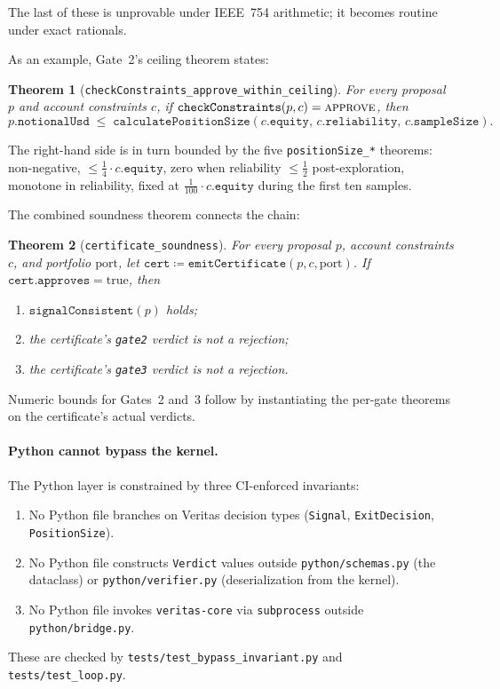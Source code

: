 \documentclass[11pt, a4paper]{article}
\newtheorem{theorem}{Theorem}
\begin{document}
\noindent The last of these is unprovable under IEEE~754 arithmetic;
it becomes routine under exact rationals.

As an example, Gate~2's ceiling theorem states:
\begin{theorem}[\texttt{checkConstraints\_approve\_within\_ceiling}]
\label{thm:gate2}
For every proposal $p$ and account constraints $c$, if
$\texttt{checkConstraints}(p, c) = \textsc{approve}$, then
\[
  p.\texttt{notionalUsd} \;\leq\;
  \texttt{calculatePositionSize}(c.\texttt{equity},\, c.\texttt{reliability},\, c.\texttt{sampleSize}).
\]
\end{theorem}
\noindent The right-hand side is in turn bounded by the five
\texttt{positionSize\_*} theorems: non-negative, $\leq \tfrac{1}{4} \cdot
c.\texttt{equity}$, zero when reliability $\leq \tfrac{1}{2}$
post-exploration, monotone in reliability, fixed at $\tfrac{1}{100}
\cdot c.\texttt{equity}$ during the first ten samples.

The combined soundness theorem connects the chain:
\begin{theorem}[\texttt{certificate\_soundness}]
For every proposal $p$, account constraints $c$, and portfolio
$\text{port}$, let
$\texttt{cert} \coloneqq \texttt{emitCertificate}(p, c, \text{port})$.
If $\texttt{cert}.\texttt{approves} = \text{true}$, then
\begin{enumerate}[leftmargin=2em, itemsep=1pt, topsep=2pt]
\item $\texttt{signalConsistent}(p)$ holds;
\item the certificate's \texttt{gate2} verdict is not a rejection;
\item the certificate's \texttt{gate3} verdict is not a rejection.
\end{enumerate}
\end{theorem}
\noindent Numeric bounds for Gates~2 and~3 follow by instantiating the
per-gate theorems on the certificate's actual verdicts.

\paragraph{Python cannot bypass the kernel.} The Python layer is
constrained by three CI-enforced invariants:
\begin{enumerate}[leftmargin=2em, itemsep=1pt, topsep=2pt]
\item No Python file branches on Veritas decision types
      (\texttt{Signal}, \texttt{ExitDecision}, \texttt{PositionSize}).
\item No Python file constructs \texttt{Verdict} values outside
      \texttt{python/schemas.py} (the dataclass) or
      \texttt{python/verifier.py} (deserialization from the kernel).
\item No Python file invokes \texttt{veritas-core} via
      \texttt{subprocess} outside \texttt{python/bridge.py}.
\end{enumerate}
These are checked by \texttt{tests/test\_bypass\_invariant.py} and
\texttt{tests/test\_loop.py}.
\end{document}
